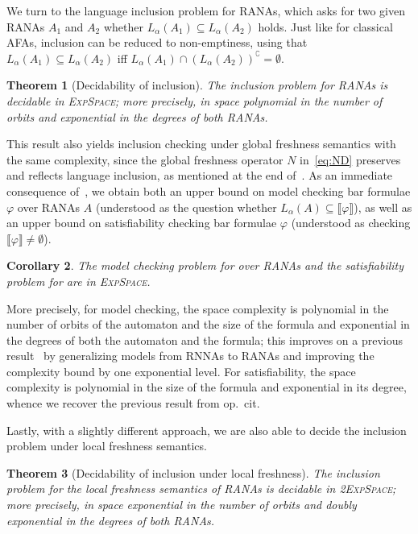 \documentclass[10pt,a4paper]{amsart}
\newtheorem{theo}{Theorem}[section]
\newtheorem{cor}[theo]{Corollary}
\theoremstyle{definition}
\renewcommand{\textsf}[1]{{\oldtextsf{\small#1}}}
\newcommand{\seq}{\subseteq}
\newcommand{\muBar}{\mbox{\textsf{Bar-$\mu$TL}}\xspace}
\newcommand{\sem}[1]{\llbracket #1 \rrbracket}
\newcommand{\EXPSPACE}{\textsc{ExpSpace}\xspace}
\begin{document}
We turn to the language inclusion problem for RANAs, which asks for two given RANAs $A_1$ and $A_2$ whether $L_\alpha(A_1) \seq L_\alpha(A_2)$ holds. Just like for classical AFAs, inclusion can be reduced to non-emptiness, using that $L_\alpha(A_1) \seq L_\alpha(A_2)$ iff $L_\alpha(A_1)\cap ({L_\alpha(A_2)})^\complement = \emptyset$.


\begin{theo}[Decidability of inclusion] \label{thm:decincl}
  The inclusion problem for RANAs
  is decidable in \EXPSPACE; more precisely, 
  in space polynomial in the number of orbits and exponential in the degrees of both RANAs.
\end{theo}



\noindent %
This result also yields inclusion checking under
global freshness semantics with the same complexity, since the global
freshness operator $N$ in~\eqref{eq:ND} preserves and reflects
language inclusion, as mentioned at the end
of~. As an immediate consequence of~,
we obtain both an upper bound on model checking bar formulae $\varphi$ over  RANAs $A$ (understood as the
question whether $L_\alpha(A) \seq \sem{\varphi}$), as well as an upper bound on satisfiability checking bar formulae
$\varphi$ (understood as checking $\sem{\varphi} \neq \emptyset$).
\begin{cor}
  The model checking problem for \muBar{} over RANAs and the satisfiability problem for \muBar{} are in
  \EXPSPACE.
\end{cor}
\noindent
More precisely, for model checking, the space complexity is polynomial in the number of orbits of
the automaton and the size of the formula and exponential in the degrees of both the automaton
and the formula; this improves on a previous result~\cite[Thm.~7.2]{hms21} by generalizing models
from RNNAs to RANAs and improving the complexity bound by one exponential
level. For satisfiability, the space complexity is polynomial in the size of the formula and
exponential in its degree, whence we recover the previous result from op.~cit.

Lastly, with a slightly different approach, we are
also able to decide the inclusion problem under local freshness
semantics.


\begin{theo}[Decidability of inclusion under local freshness]
  The inclusion problem for the local freshness semantics of RANAs is decidable
  in 2\EXPSPACE; more precisely, in space exponential in the number
  of orbits and doubly exponential in the degrees of both RANAs.
\end{theo}
\end{document}
